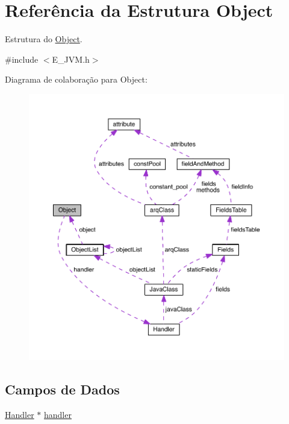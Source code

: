 \hypertarget{struct_object}{}\section{Referência da Estrutura Object}
\label{struct_object}


Estrutura do \hyperlink{struct_object}{Object}.  




{\ttfamily \#include $<$E\+\_\+\+J\+V\+M.\+h$>$}



Diagrama de colaboração para Object\+:\nopagebreak
\begin{figure}[H]
\begin{center}
\leavevmode
\includegraphics[width=350pt]{struct_object__coll__graph}
\end{center}
\end{figure}
\subsection*{Campos de Dados}
\begin{DoxyCompactItemize}
\item 
\hyperlink{struct_handler}{Handler} $\ast$ \hyperlink{struct_object_aad3f75cdc4a1d18ef18974c6106d64ad}{handler}
\end{DoxyCompactItemize}


